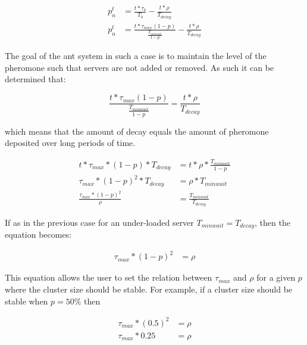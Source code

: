 \documentclass[conference]{IEEEtran}
\begin{document}
\begin{equation}
\begin{aligned}
p^{t}_{n} &= \frac{t *  \tau_{b}}{T_{b}} - \frac{t *  \rho}{T_{decay}} \\
p^{t}_{n} &= \frac{t *  \tau_{max}(1 - p)}{\frac{T_{minwait}}{1 - p}} - \frac{t *  \rho}{T_{decay}}
\end{aligned}
\end{equation}

The goal of the ant system in such a case is to maintain the level of the pheromone such that servers are not added or removed. As such it can be determined that:

\begin{equation}
\frac{t *  \tau_{max}(1 - p)}{\frac{T_{minwait}}{1 - p}} = \frac{t *  \rho}{T_{decay}}
\end{equation}

which means that the amount of decay equals the amount of pheromone deposited over long periods of time.

\begin{equation}
\begin{aligned}
t *  \tau_{max} * (1 - p) * T_{decay} &= t *  \rho * \frac{T_{minwait}}{1 - p} \\
\tau_{max} * (1 - p)^2 * T_{decay} &= \rho * T_{minwait} \\
\frac{\tau_{max} * (1 - p)^2}{\rho} &= \frac{T_{minwait}}{T_{decay}}
\end{aligned}
\end{equation}

If as in the previous case for an under-loaded server $T_{minwait} = T_{decay}$, then the equation becomes:

\begin{equation}
\begin{aligned}
\tau_{max} * (1 - p)^2 &= \rho
\end{aligned}
\end{equation}

This equation allows the user to set the relation between $\tau_{max}$ and $\rho$ for a given $p$ where the cluster size should be stable. For example, if a cluster size should be stable when $p = 50\%$ then

\begin{equation}
\begin{aligned}
\tau_{max} * (0.5)^2 &= \rho \\
\tau_{max} * 0.25 &= \rho
\end{aligned}
\end{equation}
\end{document}
